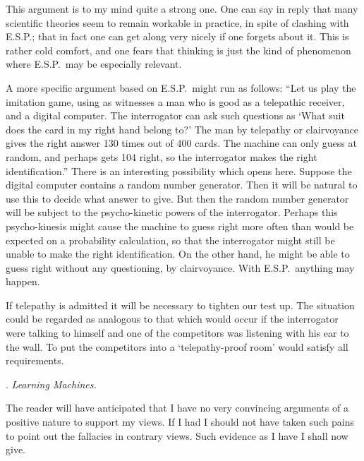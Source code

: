 \documentclass[10pt]{article} %
\begin{document}
This argument is to my mind quite a strong one. One can say in reply that many scientific theories seem to remain workable in practice, in spite of clashing with E.S.P.; that in fact one can get along very nicely if one forgets about it. This is rather cold comfort, and one fears that thinking is just the kind of phenomenon where E.S.P.~may be especially relevant.

A more specific argument based on E.S.P.~might run as follows: ``Let us play the imitation game, using as witnesses a man who is good as a telepathic receiver, and a digital computer. The interrogator can ask such questions as `What suit does the card in my right hand belong to?' The man by telepathy or clairvoyance gives the right answer 130 times out of 400 cards. The machine can only guess at random, and perhaps gets 104 right, so the interrogator makes the right identification.'' There is an interesting possibility which opens here. Suppose the digital computer contains a random number generator. Then it will be natural to use this to decide what answer to give. But then the random number generator will be subject to the psycho-kinetic powers of the interrogator. Perhaps this psycho-kinesis might cause the machine to guess right more often than would be expected on a probability calculation, so that the interrogator might still be unable to make the right identification. On the other hand, he might be able to guess right without any questioning, by clairvoyance. With E.S.P.~anything may happen.

If telepathy is admitted it will be necessary to tighten our test up. The situation could be regarded as analogous to that which would occur if the interrogator were talking to himself and one of the competitors was listening with his ear to the wall. To put the competitors into a `telepathy-proof room' would satisfy all requirements.

\vspace{0.5\baselineskip} %
\noindent{}. \textit{Learning Machines.}
\vspace{0.5\baselineskip} %

The reader will have anticipated that I have no very convincing arguments of a positive nature to support my views. If I had I should not have taken such pains to point out the fallacies in contrary views. Such evidence as I have I shall now give.
\end{document}
